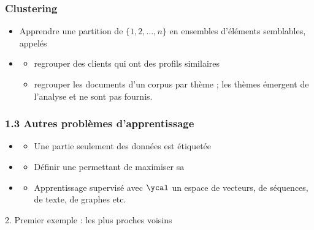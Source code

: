 \begin{frame}
  \frametitle{Clustering}
  \begin{itemize}
  \item[] Apprendre une partition de $\{1, 2, \dots, n\}$ en ensembles
    d'éléments semblables, appelés 
  \item {}
    \begin{itemize}
    \item {} regrouper des clients qui ont des
      profils similaires
    \item {} regrouper les documents d'un corpus par
      thème ; les thèmes émergent de l'analyse et ne sont pas fournis. %
    \end{itemize}
  \end{itemize}
\end{frame}


  \begin{frame}
  \frametitle{1.3 Autres problèmes d'apprentissage}
  
  \begin{itemize}
  \item {}
    \begin{itemize}
    \item[] Une partie seulement des données est étiquetée
    \end{itemize}
  \item {}
    \begin{itemize}
    \item[] Définir une  permettant de maximiser sa  
    \end{itemize}
  \item {}
    \begin{itemize}
    \item[] Apprentissage supervisé avec $\ycal$ un espace de vecteurs, de
      séquences, de texte, de graphes etc.
    \end{itemize}
  \end{itemize}
\end{frame}

\begin{frame}
  \begin{center}
    \large{2. Premier exemple : les plus proches voisins}
  \end{center}
\end{frame}

